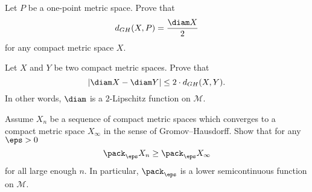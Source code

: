 \begin{pr}\label{ex:point-diam}
Let $P$ be a one-point metric space. 
Prove that 
$$d_{GH} (X, P ) = \frac{\diam X}2$$ for any compact metric space $X$.
\end{pr}

\begin{pr}\label{ex:d_GH-and-diam}
 Let $X$ and $Y$ be two compact metric spaces.
Prove that 
$$|\diam X - \diam Y |\le 2\cdot d_{GH} (X, Y ).$$
In other words, $\diam$ is a $2$-Lipschitz function on $\mathcal{M}$.
\end{pr}

\begin{pr}\label{ex:pack-GH}
Assume $X_n$ be a sequence of compact metric spaces which converges to a compact metric space $X_\infty$
in the sense of Gromov--Hausdorff.
Show that for any $\eps>0$
$$\pack_\eps X_n\ge\pack_\eps X_\infty$$ 
for all large enough $n$.
In particular, $\pack_\eps$ is a lower semicontinuous function on $\mathcal{M}$.
\end{pr}

